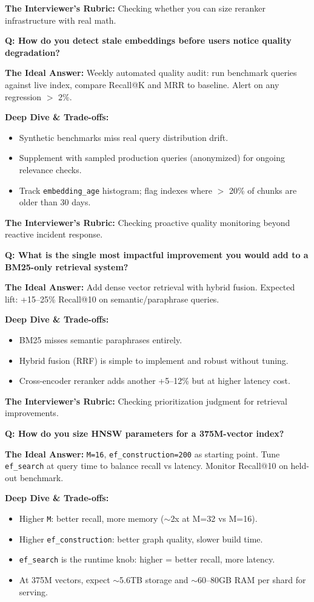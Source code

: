 \textbf{The Interviewer's Rubric:} Checking whether you can size reranker infrastructure with real math.

\textbf{Q: How do you detect stale embeddings before users notice quality degradation?}

\textbf{The Ideal Answer:} Weekly automated quality audit: run benchmark queries against live index, compare Recall@K and MRR to baseline. Alert on any regression $>$ 2\%.

\textbf{Deep Dive \& Trade-offs:}
\begin{itemize}
  \item Synthetic benchmarks miss real query distribution drift.
  \item Supplement with sampled production queries (anonymized) for ongoing relevance checks.
  \item Track \texttt{embedding\_age} histogram; flag indexes where $>$ 20\% of chunks are older than 30 days.
\end{itemize}

\textbf{The Interviewer's Rubric:} Checking proactive quality monitoring beyond reactive incident response.

\textbf{Q: What is the single most impactful improvement you would add to a BM25-only retrieval system?}

\textbf{The Ideal Answer:} Add dense vector retrieval with hybrid fusion. Expected lift: +15--25\% Recall@10 on semantic/paraphrase queries.

\textbf{Deep Dive \& Trade-offs:}
\begin{itemize}
  \item BM25 misses semantic paraphrases entirely.
  \item Hybrid fusion (RRF) is simple to implement and robust without tuning.
  \item Cross-encoder reranker adds another +5--12\% but at higher latency cost.
\end{itemize}

\textbf{The Interviewer's Rubric:} Checking prioritization judgment for retrieval improvements.

\textbf{Q: How do you size HNSW parameters for a 375M-vector index?}

\textbf{The Ideal Answer:} \texttt{M=16}, \texttt{ef\_construction=200} as starting point. Tune \texttt{ef\_search} at query time to balance recall vs latency. Monitor Recall@10 on held-out benchmark.

\textbf{Deep Dive \& Trade-offs:}
\begin{itemize}
  \item Higher \texttt{M}: better recall, more memory ($\sim$2x at M=32 vs M=16).
  \item Higher \texttt{ef\_construction}: better graph quality, slower build time.
  \item \texttt{ef\_search} is the runtime knob: higher = better recall, more latency.
  \item At 375M vectors, expect $\sim$5.6TB storage and $\sim$60--80GB RAM per shard for serving.
\end{itemize}

